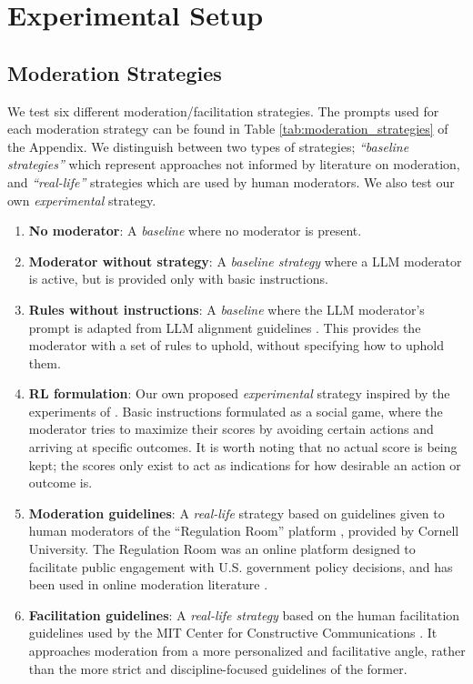\section{Experimental Setup}

\subsection{Moderation Strategies}
\label{ssec:setup:strategies}

We test six different moderation/facilitation strategies. The prompts used for each moderation strategy can be found in Table \ref{tab:moderation_strategies} of the Appendix. We distinguish between two types of strategies; \emph{“baseline strategies”} which represent approaches not informed by literature on moderation, and \emph{“real-life”} strategies which are used by human moderators. We also test our own \emph{experimental} strategy.

\begin{enumerate}[noitemsep]
    \item \textbf{No moderator}: A \emph{baseline} where no moderator is present.

    \item \textbf{Moderator without strategy}: A \emph{baseline strategy} where a \ac{LLM} moderator is active, but is provided only with basic instructions.

    \item \textbf{Rules without instructions}: A \emph{baseline} where the \ac{LLM} moderator's prompt is adapted from \ac{LLM} alignment guidelines \cite{collective_constitution}. This provides the moderator with a set of rules to uphold, without specifying how to uphold them.
    
    \item \textbf{RL formulation}: Our own proposed \emph{experimental} strategy inspired by the experiments of \citet{abdelnabi_negotiations}. Basic instructions formulated as a social game, where the moderator tries to maximize their scores by avoiding certain actions and arriving at specific outcomes. It is worth noting that no actual score is being kept; the scores only exist to act as indications for how desirable an action or outcome is. 

    \item \textbf{Moderation guidelines}: A \emph{real-life} strategy based on guidelines given to human moderators of the “Regulation Room” platform \citep{Cornell_eRulemaking2017}, provided by Cornell University. The Regulation Room was an online platform designed to facilitate public engagement with U.S. government policy decisions, and has been used in online moderation literature \cite{seering_self_moderation, park_et_al_2012_facilitation}.

    \item \textbf{Facilitation guidelines}: A \emph{real-life strategy} based on the human facilitation guidelines used by the MIT Center for Constructive Communications \cite{dimitra-book}. It approaches moderation from a more personalized and facilitative angle, rather than the more strict and discipline-focused guidelines of the former.
\end{enumerate}


